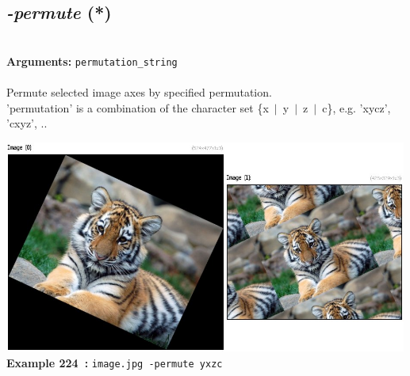 \documentclass[a4paper,11pt,twoside]{book}
\begin{document}
\subsection{\emph{-permute} (*)}\vspace*{-0.5em}
~\\\textbf{Arguments: } 
{\small \texttt{permutation\_string}}\\~\\
Permute selected image axes by specified permutation.
~\\'permutation' is a combination of the character set \{x~$|$~y~$|$~z~$|$~c\},
e.g. 'xycz', 'cxyz', ..
\begin{center}\includegraphics[keepaspectratio=true,height=7cm,width=\textwidth]{img/gmic_def224.jpg}\\
{\footnotesize \textbf{Example 224~:} \texttt{image.jpg -permute yxzc}}
\end{center}
\end{document}
